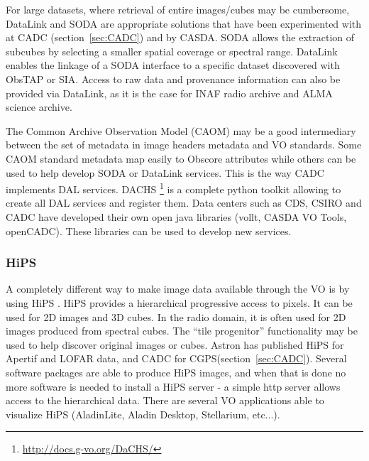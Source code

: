 \documentclass[11pt,a4paper]{ivoa}
\begin{document}
For large datasets, where retrieval of entire images/cubes may be cumbersome,  DataLink and SODA are appropriate solutions that have been experimented with at CADC (section~\ref{sec:CADC}) and by CASDA. SODA allows the extraction of subcubes by selecting a smaller spatial coverage or spectral range. DataLink enables the linkage of a SODA interface to a specific dataset discovered with ObsTAP or SIA. Access to raw data and provenance information can also be provided via DataLink, as it is the case for INAF radio archive and ALMA science archive.

The Common Archive Observation Model (CAOM) may be a good intermediary between the set of metadata in image headers metadata and VO standards. Some CAOM standard metadata map easily to Obscore attributes while others can be used to help develop SODA or DataLink services. This is the way CADC implements DAL services. DACHS \footnote{\url{http://docs.g-vo.org/DaCHS/}} is a complete python toolkit allowing to create all DAL services and register them. Data centers such as CDS, CSIRO and CADC have developed their own open java libraries (vollt, CASDA VO Tools, openCADC). These libraries can be used to develop new services.


\subsubsection{HiPS}
A completely different way to make image data available through the VO is by using HiPS \citep{2017ivoa.spec.0519F}. HiPS provides a hierarchical progressive access to pixels. It can be used for 2D images and 3D cubes. In the radio domain, it is often used for 2D images produced from spectral cubes. The ``tile progenitor''  functionality may be used to help discover original images or cubes. Astron has published HiPS for Apertif and LOFAR data, and CADC for CGPS(section~\ref{sec:CADC}). Several software packages are able to produce HiPS images, and when that is done no more software is needed to install a HiPS server - a simple http server allows access to the hierarchical data. There are several VO applications able to visualize HiPS (AladinLite, Aladin Desktop, Stellarium, etc...). 
\end{document}
